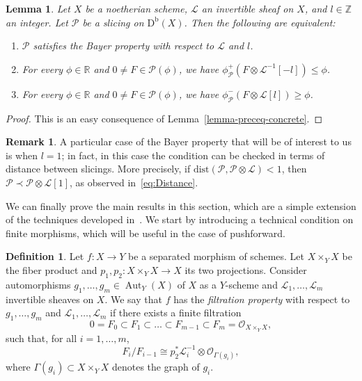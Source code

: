 \documentclass[11pt, reqno]{amsart}
\numberwithin{equation}{section}
\theoremstyle{plain}
\newtheorem{lemma}[theorem]{Lemma}
\theoremstyle{remark}
\theoremstyle{definition}
\newtheorem{definition}[theorem]{Definition}
\newtheorem{remark}[theorem]{Remark}
\theoremstyle{italicsname}
\newcommand{\Db}{\mathrm{D^b}}
\DeclareMathOperator{\Aut}{Aut}
\newcommand{\cO}{\mathcal{O}}
\newcommand{\cL}{\mathcal{L}}
\newcommand{\cP}{\mathscr{P}}
\def\RR{\ensuremath{\mathbb{R}}}
\def\ZZ{\ensuremath{\mathbb{Z}}}
\begin{document}
\begin{lemma}
    \label{lemma-BL-concrete}
Let $X$ be a noetherian scheme, $\cL$ an invertible sheaf on $X$, and $l \in \ZZ$ an integer.  
Let $\cP$ be a slicing on $\Db(X)$. 
Then the following are equivalent: 
\begin{enumerate}[{\rm (1)}]
    \item $\cP$ satisfies the Bayer property with respect to $\cL$ and $l$. 
    \item For every $\phi \in \RR$ and $0 \neq F \in \cP(\phi)$, we have $\phi^+_\cP(F\otimes\cL^{-1}[-l])\leq\phi$. 
    \item For every $\phi \in \RR$ and $0 \neq F \in \cP(\phi)$, we have $\phi^-_\cP(F\otimes\cL[l]) \geq \phi$. 
\end{enumerate}
\end{lemma}

\begin{proof}
    This is an easy consequence of Lemma~\ref{lemma-preceq-concrete}. 
\end{proof}

\begin{remark}
    A particular case of the Bayer property that will be of interest to us is when $l=1$; in fact, in this case the condition can be checked in terms of distance between slicings. 
More precisely, if $\mathrm{dist}(\cP,\cP\otimes\cL)<1$, then $\cP\prec\cP\otimes\cL[1]$, as observed in~\eqref{eq:Distance}.
\end{remark}

We can finally prove the main results in this section, which are a simple extension of the techniques developed in~\cite{Li:sb,chunyi-stability}.
We start by introducing a technical condition on finite morphisms, which will be useful in the case of pushforward.

\begin{definition}\label{def:FiltrationProperty}
Let $f \colon X \to Y$ be a separated morphism of schemes.
Let $X\times_Y X$ be the fiber product and $p_1,p_2\colon X\times_Y X\to X$ its two projections.
Consider automorphisms $g_1,\dots,g_m\in\Aut_Y(X)$ of $X$ as a $Y$-scheme and $\cL_1,\dots,\cL_m$ invertible sheaves on $X$.
We say that $f$ has the \emph{filtration property} with respect to $g_1,\dots,g_m$ and $\cL_1,\dots,\cL_m$ if there exists a finite filtration
\[
0=F_{0}\subset F_1\subset\dots\subset F_{m-1}\subset F_m=\cO_{X\times_Y X},
\]
such that, for all $i=1,\dots,m$,
\[
F_i/F_{i-1} \cong p_2^*\cL_i^{-1}\otimes\cO_{\Gamma(g_i)},
\]
where $\Gamma(g_i)\subset X\times_Y X$ denotes the graph of $g_i$.    
\end{definition}
\end{document}
